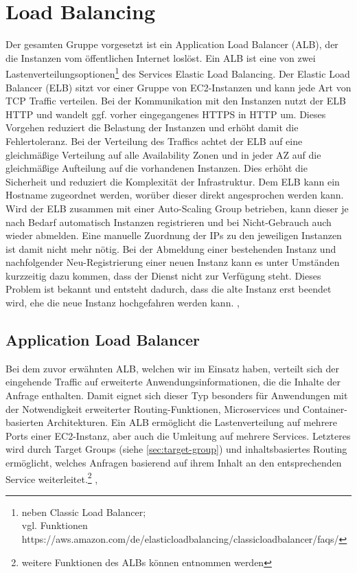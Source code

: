 \section{Load Balancing}
\label{sec:elb}
Der gesamten Gruppe vorgesetzt ist ein Application Load Balancer (ALB), der die Instanzen vom öffentlichen Internet loslöst. Ein ALB ist eine von zwei Lastenverteilungsoptionen\footnote{neben Classic Load Balancer; \\vgl. Funktionen https://aws.amazon.com/de/elasticloadbalancing/classicloadbalancer/faqs/} des Services Elastic Load Balancing.
Der Elastic Load Balancer (ELB) sitzt vor einer Gruppe von EC2-Instanzen und kann jede Art von TCP Traffic verteilen. Bei der Kommunikation mit den Instanzen nutzt der ELB HTTP und wandelt ggf. vorher eingegangenes HTTPS in HTTP um. Dieses Vorgehen reduziert die Belastung der Instanzen und erhöht damit die Fehlertoleranz. Bei der Verteilung des Traffics achtet der ELB auf eine gleichmäßige Verteilung auf alle Availability Zonen und in jeder AZ auf die gleichmäßige Aufteilung auf die vorhandenen Instanzen. Dies erhöht die Sicherheit und reduziert die Komplexität der Infrastruktur. Dem ELB kann ein Hostname zugeordnet werden, worüber dieser direkt angesprochen werden kann. \\
Wird der ELB zusammen mit einer Auto-Scaling Group betrieben, kann dieser je nach Bedarf automatisch Instanzen registrieren und bei Nicht-Gebrauch auch wieder abmelden. Eine manuelle Zuordnung der IPs zu den jeweiligen Instanzen ist damit nicht mehr nötig. Bei der Abmeldung einer bestehenden Instanz und nachfolgender Neu-Registrierung einer neuen Instanz kann es unter Umständen kurzzeitig dazu kommen, dass der Dienst nicht zur Verfügung steht. Dieses Problem ist bekannt und entsteht dadurch, dass die alte Instanz erst beendet wird, ehe die neue Instanz hochgefahren werden kann.
\cite{vliet:resilience}, \cite{aws:elb} \\

\subsection{Application Load Balancer}
\label{sec:alb}
Bei dem zuvor erwähnten ALB, welchen wir im Einsatz haben, verteilt sich der eingehende Traffic auf erweiterte Anwendungsinformationen, die die Inhalte der Anfrage enthalten. Damit eignet sich dieser Typ besonders für Anwendungen mit der Notwendigkeit erweiterter Routing-Funktionen, Microservices und Container-basierten Architekturen. Ein ALB ermöglicht die Lastenverteilung auf mehrere Ports einer EC2-Instanz, aber auch die Umleitung auf mehrere Services. Letzteres wird durch Target Groups (siehe \ref{sec:target-group}) und inhaltsbasiertes Routing ermöglicht, welches Anfragen basierend auf ihrem Inhalt an den entsprechenden Service weiterleitet.\footnote{weitere Funktionen des ALBs können \cite{aws:alb} entnommen werden} \cite{aws:elb}, \cite{aws:alb}

